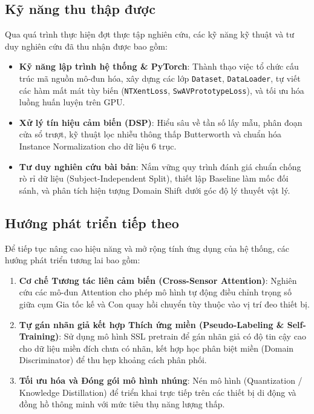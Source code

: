 \subsection{Kỹ năng thu thập được}
Qua quá trình thực hiện đợt thực tập nghiên cứu, các kỹ năng kỹ thuật và tư duy nghiên cứu đã thu nhận được bao gồm:
\begin{itemize}
    \item \textbf{Kỹ năng lập trình hệ thống \& PyTorch}: Thành thạo việc tổ chức cấu trúc mã nguồn mô-đun hóa, xây dựng các lớp \texttt{Dataset}, \texttt{DataLoader}, tự viết các hàm mất mát tùy biến (\texttt{NTXentLoss}, \texttt{SwAVPrototypeLoss}), và tối ưu hóa luồng huấn luyện trên GPU.
    \item \textbf{Xử lý tín hiệu cảm biến (DSP)}: Hiểu sâu về tần số lấy mẫu, phân đoạn cửa sổ trượt, kỹ thuật lọc nhiễu thông thấp Butterworth và chuẩn hóa Instance Normalization cho dữ liệu 6 trục.
    \item \textbf{Tư duy nghiên cứu bài bản}: Nắm vững quy trình đánh giá chuẩn chống rò rỉ dữ liệu (Subject-Independent Split), thiết lập Baseline làm mốc đối sánh, và phân tích hiện tượng Domain Shift dưới góc độ lý thuyết vật lý.
\end{itemize}

\subsection{Hướng phát triển tiếp theo}
Để tiếp tục nâng cao hiệu năng và mở rộng tính ứng dụng của hệ thống, các hướng phát triển tương lai bao gồm:
\begin{enumerate}
    \item \textbf{Cơ chế Tương tác liên cảm biến (Cross-Sensor Attention)}: Nghiên cứu các mô-đun Attention cho phép mô hình tự động điều chỉnh trọng số giữa cụm Gia tốc kế và Con quay hồi chuyển tùy thuộc vào vị trí đeo thiết bị.
    \item \textbf{Tự gán nhãn giả kết hợp Thích ứng miền (Pseudo-Labeling \& Self-Training)}: Sử dụng mô hình SSL pretrain để gán nhãn giả có độ tin cậy cao cho dữ liệu miền đích chưa có nhãn, kết hợp học phân biệt miền (Domain Discriminator) để thu hẹp khoảng cách phân phối.
    \item \textbf{Tối ưu hóa và Đóng gói mô hình nhúng}: Nén mô hình (Quantization / Knowledge Distillation) để triển khai trực tiếp trên các thiết bị di động và đồng hồ thông minh với mức tiêu thụ năng lượng thấp.
\end{enumerate}
